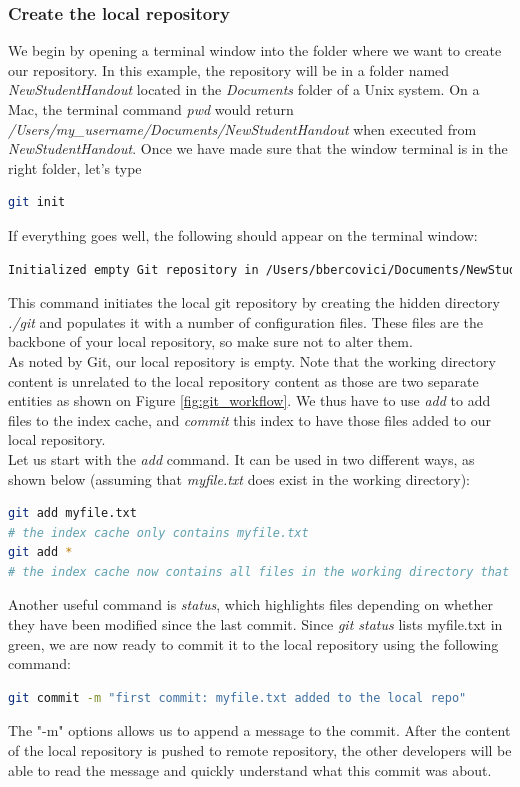 \documentclass{report}
\begin{document}
\subsubsection{Create the local repository}
We begin by opening a terminal window into the folder where we want to create our repository. In this example, the repository will be in a folder named \textit{NewStudentHandout} located in the \textit{Documents} folder of a Unix system. On a Mac, the terminal command \textit{pwd} would return 
\textit{/Users/my\_username/Documents/NewStudentHandout} when executed from \textit{NewStudentHandout}. Once we have made sure that the window terminal is in the right folder, let's type
\begin{lstlisting}[language=bash, caption=Creation of the local repository]
git init
\end{lstlisting}
If everything goes well, the following should appear on the terminal window:
\begin{lstlisting}[language=bash, caption=Successful git init message ]
Initialized empty Git repository in /Users/bbercovici/Documents/NewStudentHandout/.git/
\end{lstlisting}
This command initiates the local git repository by creating the hidden directory \textit{./git} and populates it with a number of configuration files. These files are the backbone of your local repository, so make sure not to alter them.\\
As noted by Git, our local repository is empty. Note that the working directory content is unrelated to the local repository content as those are two separate entities as shown on Figure \ref{fig:git_workflow}. We thus have to use \textit{add} to add files to the index cache, and \textit{commit} this index to have those files added to our local repository.\\
Let us start with the \textit{add} command. It can be used in two different ways, as shown below (assuming that \textit{myfile.txt} does exist in the working directory):
\begin{lstlisting}[language=bash, caption=Add files to the cache ]
git add myfile.txt
# the index cache only contains myfile.txt
git add *
# the index cache now contains all files in the working directory that were not excluded in .gitignore 
\end{lstlisting}
Another useful command is \textit{status}, which highlights files depending on whether they have been modified since the last commit. Since \textit{git status} lists myfile.txt in green, we are now ready to commit it to the local repository using the following command:
\begin{lstlisting}[language=bash, caption=commit files to the local repository ]
git commit -m "first commit: myfile.txt added to the local repo"
\end{lstlisting}
The "-m" options allows us to append a message to the commit. After the content of the local repository is pushed to remote repository, the other developers will be able to read the message and quickly understand what this commit was about.
\end{document}

